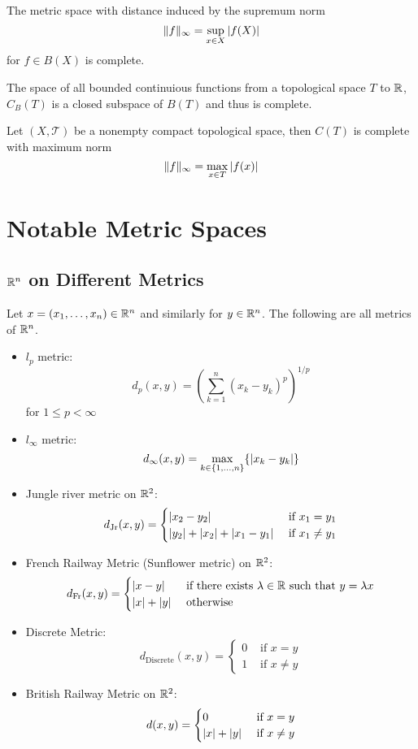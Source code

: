 \documentclass[a4paper]{article}
\begin{document}
\begin{prp}{}{} The metric space with distance induced by the supremum norm $$\|f\|_{\infty}=\sup_{x\in X}\abs{f(X)}$$ for $f\in B(X)$ is complete. 
\end{prp}

\begin{prp}{}{} The space of all bounded continuious functions from a topological space $T$ to $\mathbb{R}$, $C_B(T)$ is a closed subspace of $B(T)$ and thus is complete. 
\end{prp}

\begin{crl}{}{} Let $(X,\mathcal{T})$ be a nonempty compact topological space, then $C(T)$ is complete with maximum norm $$\|f\|_\infty=\max_{x\in T}\abs{f(x)}$$
\end{crl}


\pagebreak
\section{Notable Metric Spaces}
\subsection{$\mathbb{R}^n$ on Different Metrics}
\begin{thm}{}{} Let $x=(x_1,\dots,x_n)\in\mathbb{R}^n$ and similarly for $y\in\mathbb{R}^n$. The following are all metrics of $\mathbb{R}^n$. 
\begin{itemize}
\item $l_p$ metric: $$d_p(x,y)=\left(\sum_{k=1}^n(x_k-y_k)^p\right)^{1/p}$$ for $1\leq p<\infty$
\item $l_\infty$ metric: $$d_{\infty}(x,y)=\max_{k\in\{1,\dots,n\}}\{\abs{x_k-y_k}\}$$
\item Jungle river metric on $\mathbb{R}^2$: $$d_{\text{Jr}}(x,y)=\begin{cases}
\abs{x_2-y_2} & \text{ if }x_1=y_1\\
\abs{y_2}+\abs{x_2}+\abs{x_1-y_1} & \text{ if }x_1\neq y_1
\end{cases}$$
\item French Railway Metric (Sunflower metric) on $\mathbb{R}^2$: $$d_{\text{Fr}}(x,y)=\begin{cases}
\abs{x-y} & \text{ if there exists $\lambda\in\mathbb{R}$ such that } y=\lambda x\\
\abs{x}+\abs{y} & \text{ otherwise }
\end{cases}$$
\item Discrete Metric: $$d_{\text{Discrete}}(x,y)=\begin{cases}
0 & \text{ if } x=y\\
1 & \text{ if } x\neq y
\end{cases}$$
\item British Railway Metric on $\mathbb{R}^2$: $$d(x,y)=\begin{cases}
0 & \text{ if } x=y\\
\abs{x}+\abs{y} & \text{ if } x\neq y
\end{cases}$$
\end{itemize}
\end{thm}
\end{document}
